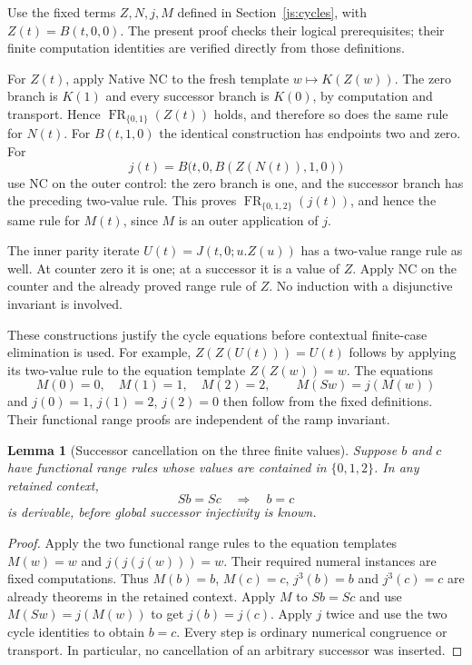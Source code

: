 \documentclass[11pt]{article}
\newtheorem{lemma}[theorem]{Lemma}
\theoremstyle{definition}
\begin{document}
Use the fixed terms $Z,N,j,M$ defined in
Section~\ref{js:cycles}, with $Z(t)=B(t,0,0)$. The present proof
checks their logical prerequisites; their finite computation identities
are verified directly from those definitions.

For $Z(t)$, apply Native NC to the fresh template $w\mapsto K(Z(w))$.
The zero branch is $K(1)$ and every successor branch is $K(0)$, by
computation and transport.  Hence $\operatorname{FR}_{\{0,1\}}(Z(t))$
holds, and therefore so does the same rule for $N(t)$.
For $B(t,1,0)$ the identical construction has endpoints two and zero.
For
\[
 j(t)=B\bigl(t,0,B(Z(N(t)),1,0)\bigr)
\]
use NC on the outer control: the zero branch is one, and the successor
branch has the preceding two-value rule.  This proves
$\operatorname{FR}_{\{0,1,2\}}(j(t))$, and hence the same rule for
$M(t)$, since $M$ is an outer application of $j$.

The inner parity iterate $U(t)=J(t,0;u.Z(u))$ has a two-value range
rule as well.  At counter zero it is one; at a successor it is a value
of $Z$.  Apply NC on the counter and the already proved range rule of
$Z$.  No induction with a disjunctive invariant is involved.

These constructions justify the cycle equations before contextual
finite-case elimination is used.  For example, $Z(Z(U(t)))=U(t)$ follows
by applying its two-value rule to the equation template $Z(Z(w))=w$.
The equations
\[
 M(0)=0,\quad M(1)=1,\quad M(2)=2,\qquad M(Sw)=j(M(w))
\]
and $j(0)=1$, $j(1)=2$, $j(2)=0$ then follow from the fixed definitions.
Their functional range proofs are independent of the ramp invariant.

\begin{lemma}[Successor cancellation on the three finite values]
\label{nb:finite-cancellation}
Suppose $b$ and $c$ have functional range rules whose values are contained
in $\{0,1,2\}$.  In any retained context,
\[
                         Sb=Sc\quad\Longrightarrow\quad b=c
\]
is derivable, before global successor injectivity is known.
\end{lemma}
\begin{proof}
Apply the two functional range rules to the equation templates
$M(w)=w$ and $j(j(j(w)))=w$.  Their required numeral instances are fixed
computations.  Thus $M(b)=b$, $M(c)=c$, $j^3(b)=b$ and $j^3(c)=c$
are already theorems in the retained context.
Apply $M$ to $Sb=Sc$ and use $M(Sw)=j(M(w))$ to get $j(b)=j(c)$.
Apply $j$ twice and use the two cycle identities to obtain $b=c$.
Every step is ordinary numerical congruence or transport.  In particular,
no cancellation of an arbitrary successor was inserted.
\end{proof}
\end{document}
